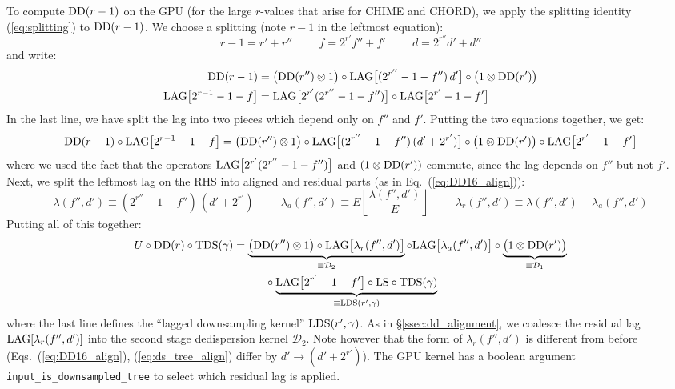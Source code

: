 \documentclass{article}
\numberwithin{equation}{section}   %
\def\DD{{\rm DD}}
\def\TDS{{\rm TDS}}
\def\LDS{{\rm LDS}}
\def\LS{{\rm LS}}
\def\LAG{{\rm LAG}}
\def\nn{\nonumber}
\begin{document}
To compute $\DD(r-1)$ on the GPU (for the large $r$-values that arise for CHIME and CHORD),
we apply the splitting identity (\ref{eq:splitting}) to $\DD(r-1)$.
We choose a splitting (note $r-1$ in the leftmost equation):
\begin{equation}
r-1 = r'+r''
  \hspace{1cm}
f = 2^{r'} f'' + f'
  \hspace{1cm}
d = 2^{r''} d' + d''
\end{equation}
and write:
\begin{align}
\DD(r-1)
  &= \big( \DD(r'') \otimes 1 \big)
       \circ \LAG\big[ (2^{r''}-1-f'') \, d' \big] 
       \circ \big( 1 \otimes \DD(r') \big) \\
\LAG\big[ 2^{r-1} - 1 - f\big]
  &= \LAG\big[ 2^{r'} (2^{r''}-1-f'') \big] \circ \LAG\big[ 2^{r'}-1-f' \big]
\end{align}
In the last line, we have split the lag into two pieces which depend only on
$f''$ and $f'$.
Putting the two equations together, we get:
\begin{equation}
\DD(r-1) \circ \LAG\big[ 2^{r-1} - 1 - f\big] = 
  \big( \DD(r'') \otimes 1 \big)
       \circ \LAG\big[ (2^{r''}-1-f'') \, (d'+2^{r'}) \big]
       \circ \big( 1 \otimes \DD(r') \big)
  \circ \LAG\big[ 2^{r'}-1-f' \big]
\end{equation}
where we used the fact that the operators $\LAG\big[ 2^{r'} (2^{r''}-1-f'') \big]$ and $(1 \otimes \DD(r'))$ commute,
since the lag depends on $f''$ but not $f'$.
Next, we split the leftmost lag on the RHS into aligned and residual parts (as in Eq.\ (\ref{eq:DD16_align})):
\begin{equation}
\lambda(f'',d') \equiv (2^{r''}-1-f'') \, (d'+2^{r'})
  \hspace{1cm}
\lambda_a(f'',d') \equiv E \left\lfloor \frac{\lambda(f'',d')}{E} \right\rfloor
  \hspace{1cm}
\lambda_r(f'',d') \equiv \lambda(f'',d') - \lambda_a(f'',d')
\label{eq:ds_tree_align}
\end{equation}
Putting all of this together:
\begin{align}
U \circ \DD(r) \circ \TDS(\gamma)
  &= 
\underbrace{\big( \DD(r'') \otimes 1 \big) 
            \circ \LAG\big[ \lambda_r(f'',d') \big] }_{\equiv {\mathcal D}_2}
   \circ \LAG\big[ \lambda_a(f'',d') \big]
   \circ \underbrace{\big( 1 \otimes \DD(r') \big)}_{\equiv {\mathcal D}_1} \nn \\
 & \hspace{1cm} \circ \underbrace{\LAG\big[ 2^{r'}-1-f' \big] \circ \LS \circ \TDS(\gamma)}_{\equiv \LDS(r',\gamma)}
  \label{eq:U_DD_TDS}
\end{align}
where the last line defines the ``lagged downsampling kernel'' $\LDS(r',\gamma)$.
As in \S\ref{ssec:dd_alignment}, we coalesce the residual lag $\LAG[\lambda_r(f'',d')]$ into
the second stage dedispersion kernel ${\mathcal D}_2$.
Note however that the form of $\lambda_r(f'',d')$ is different from before (Eqs.\ (\ref{eq:DD16_align}),
(\ref{eq:ds_tree_align}) differ by $d' \rightarrow (d'+2^{r'})$).
The GPU kernel has a boolean argument \verb|input_is_downsampled_tree| to select which residual
lag is applied.
\end{document}
